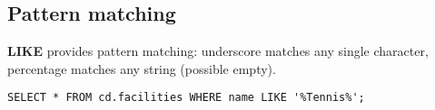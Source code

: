 %

\subsection{Pattern matching}
\textbf{LIKE} provides pattern matching: underscore matches any single character, percentage matches any string (possible empty).
\begin{verbatim}
SELECT * FROM cd.facilities WHERE name LIKE '%Tennis%';
\end{verbatim}

%